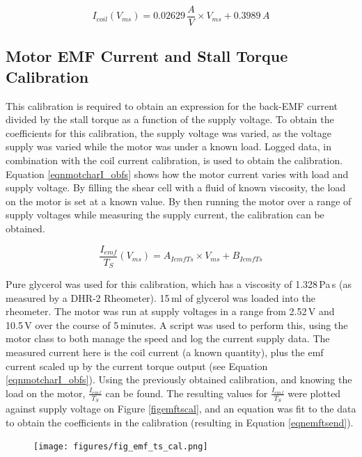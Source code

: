 \documentclass[twoside,a4]{report}
\begin{document}
	\begin{equation}
	I_{coil} (V_{ms}) = 0.02629\,\frac{A}{V} \times V_{ms} + 0.3989\,A
	\label{eqnicocalend}
	\end{equation}
	
	\subsection*{Motor EMF Current and Stall Torque Calibration}
	This calibration is required to obtain an expression for the back-EMF current divided by the stall torque as a function of the supply voltage. To obtain the coefficients for this calibration, the supply voltage was varied, as the voltage supply was varied while the motor was under a known load. Logged data, in combination with the coil current calibration, is used to obtain the calibration. Equation \ref{eqnmotcharI_obfs} shows how the motor current varies with load and supply voltage. By filling the shear cell with a fluid of known viscosity, the load on the motor is set at a known value. By then running the motor over a range of supply voltages while measuring the supply current, the calibration can be obtained.
	
	\begin{equation}
	\frac{I_{emf}}{T_S} (V_{ms}) = A_{IemfTs} \times V_{ms} + B_{IemfTs}
	\label{eqnemftsmid}
	\end{equation}
	
	\noindent
	Pure glycerol was used for this calibration, which has a viscosity of 1.328\,Pa\,s (as measured by a DHR-2 Rheometer). 15\,ml of glycerol was loaded into the rheometer. The motor was run at supply voltages in a range from 2.52\,V and 10.5\,V over the course of 5\,minutes. A script was used to perform this, using the motor class to both manage the speed and log the current supply data. The measured current here is the coil current (a known quantity), plus the emf current scaled up by the current torque output (see Equation \ref{eqnmotcharI_obfs}). Using the previously obtained calibration, and knowing the load on the motor, $\frac{I_{emf}}{T_S}$ can be found. The resulting values for $\frac{I_{emf}}{T_S}$ were plotted against supply voltage on Figure \ref{figemftscal}, and an equation was fit to the data to obtain the coefficients in the calibration (resulting in Equation \ref{eqnemftsend}).
	
	\begin{figure}[!htb]
		\centering
		\texttt{[image: figures/fig\_emf\_ts\_cal.png]}
		\caption{EMF Current \& Stall Torque Calibration Results}
		\label{figemftscal}
		\begin{subfigure}{0.9\textwidth}
			\footnotesize 
		\end{subfigure}
	\end{figure}
	
\end{document}

